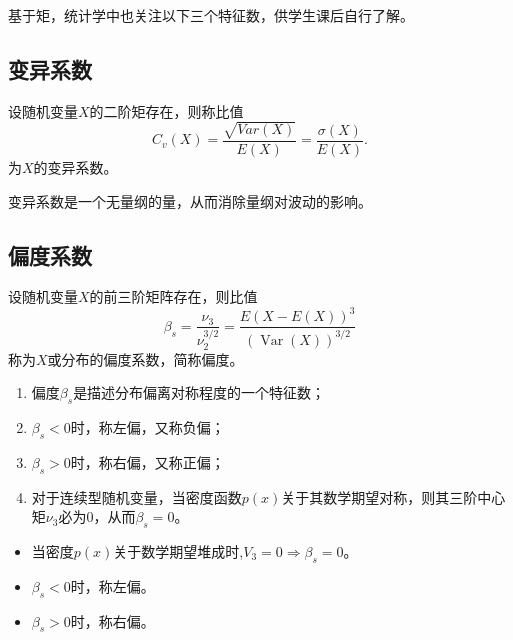 基于矩，统计学中也关注以下三个特征数，供学生课后自行了解。

\subsection{变异系数}
\begin{definition}\label{def:cv}
设随机变量$X$的二阶矩存在，则称比值
$$
C_v(X) = \frac{\sqrt{Var(X)}}{E(X)} = \frac{\sigma(X)}{E(X)}.
$$
为$X$的变异系数。
\end{definition}
\begin{remark}
    变异系数是一个无量纲的量，从而消除量纲对波动的影响。
\end{remark}
\subsection{偏度系数}
\begin{definition}\label{def:skewness}
设随机变量$X$的前三阶矩阵存在，则比值
$$\beta_{s}=\frac{\nu_{3}}{\nu_{2}^{{3}/{2}}}=\frac{E(X-E(X))^{3}}{(\operatorname{Var}(X))^{{3}/{2}}}$$
称为$X$或分布的偏度系数，简称偏度。
    
\end{definition}
\begin{remark}
    \begin{enumerate}
    \item 偏度$\beta_s$是描述分布偏离对称程度的一个特征数；
        \item $\beta_{s}<0$时，称左偏，又称负偏；
        \item $\beta_{s}>0$时，称右偏，又称正偏；
        \item 对于连续型随机变量，当密度函数$p(x)$关于其数学期望对称，则其三阶中心矩$\nu_3$必为0，从而$\beta_s =0$。
    \end{enumerate}
\end{remark}
\begin{itemize}
    \item 当密度$p(x)$关于数学期望堆成时,$V_{3}=0 \Rightarrow \beta_{s}=0$。
    \item $\beta_{s}<0$时，称左偏。
    \item $\beta_{s}>0$时，称右偏。
\end{itemize}


